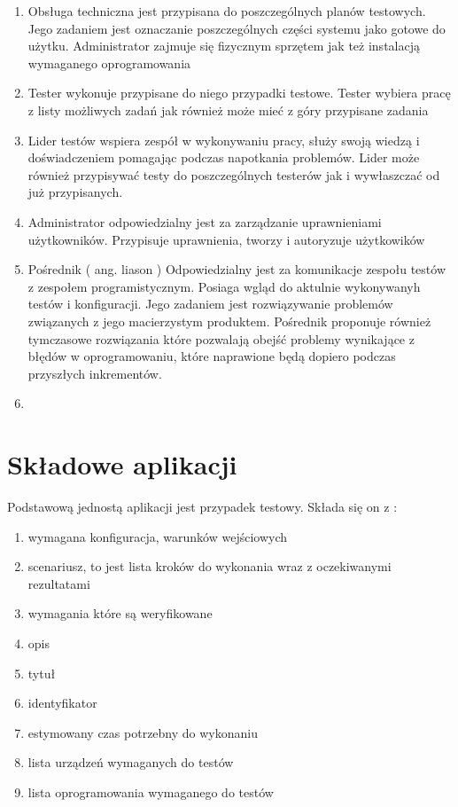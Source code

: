 \begin{enumerate}
  \item Obsługa techniczna jest przypisana do poszczególnych planów testowych. Jego zadaniem jest oznaczanie poszczególnych części systemu jako gotowe do użytku. Administrator zajmuje się fizycznym sprzętem jak też instalacją wymaganego oprogramowania
  \item Tester wykonuje przypisane do niego przypadki testowe. Tester wybiera pracę z listy możliwych zadań jak również może mieć z góry przypisane zadania
  \item Lider testów wspiera zespół w wykonywaniu pracy, służy swoją wiedzą i doświadczeniem pomagając podczas napotkania problemów. Lider może również przypisywać testy do poszczególnych testerów jak i wywłaszczać od już przypisanych.
  \item Administrator odpowiedzialny jest za zarządzanie uprawnieniami użytkowników. Przypisuje uprawnienia, tworzy i autoryzuje użytkowików
  \item Pośrednik ( ang. liason ) Odpowiedzialny jest za komunikacje zespołu testów z zespołem programistycznym. Posiaga wgląd do aktulnie wykonywanyh testów i konfiguracji. Jego zadaniem jest rozwiązywanie problemów związanych z jego macierzystym produktem. Pośrednik proponuje również tymczasowe rozwiązania które pozwalają obejść problemy wynikające z błędów w oprogramowaniu, które naprawione będą dopiero podczas przyszłych inkrementów.
  \item
  

\end{enumerate}

\section{Składowe aplikacji}


Podstawową jednostą aplikacji jest przypadek testowy. Składa się on z :
\begin{enumerate}
  \item wymagana konfiguracja, warunków wejściowych
  \item scenariusz, to jest lista kroków do wykonania wraz z oczekiwanymi rezultatami
  \item wymagania które są weryfikowane 
  \item opis
  \item tytuł
  \item identyfikator
  \item estymowany czas potrzebny do wykonaniu
  \item lista urządzeń wymaganych do testów
  \item lista oprogramowania wymaganego do testów
  
\end{enumerate}



